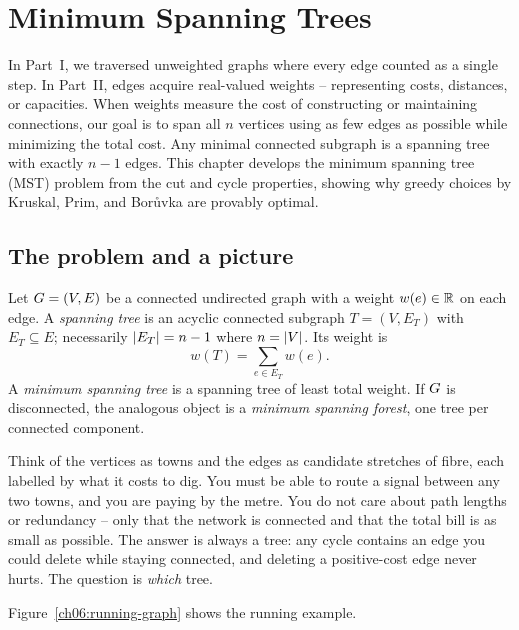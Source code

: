 \chapter{Minimum Spanning Trees}

In Part~I, we traversed unweighted graphs where every edge counted as a single
step. In Part~II, edges acquire real-valued weights -- representing costs,
distances, or capacities. When weights measure the cost of constructing or
maintaining connections, our goal is to span all $n$ vertices using as few edges
as possible while minimizing the total cost. Any minimal connected subgraph is a
spanning tree with exactly $n-1$ edges. This chapter develops the minimum spanning
tree (MST) problem from the cut and cycle properties, showing why
greedy choices by Kruskal, Prim, and Bor\r{u}vka are provably optimal.

\chapterline

\section{The problem and a picture}

\begin{definition}
Let $G=(V,E)$ be a connected undirected graph with a weight $w(e)\in\mathbb{R}$ on each edge. A \emph{spanning tree} is an acyclic connected subgraph $T=(V,E_T)$ with $E_T\subseteq E$; necessarily $\lvert E_T\rvert=n-1$ where $n=\lvert V\rvert$. Its weight is
\[ w(T) = \sum_{e\in E_T} w(e). \] A \emph{minimum spanning tree} is a spanning tree of least total weight. If $G$ is disconnected, the analogous object is a \emph{minimum spanning forest}, one tree per connected component.
\end{definition}

\begin{intuitionbox}
Think of the vertices as towns and the edges as candidate stretches of fibre, each labelled by what it costs to dig. You must be able to route a signal between any two towns, and you are paying by the metre. You do not care about path lengths or redundancy -- only that the network is connected and that the total bill is as small as possible. The answer is always a tree: any cycle contains an edge you could delete while staying connected, and deleting a positive-cost edge never hurts. The question is \emph{which} tree.
\end{intuitionbox}

Figure~\ref{ch06:running-graph} shows the running example.

